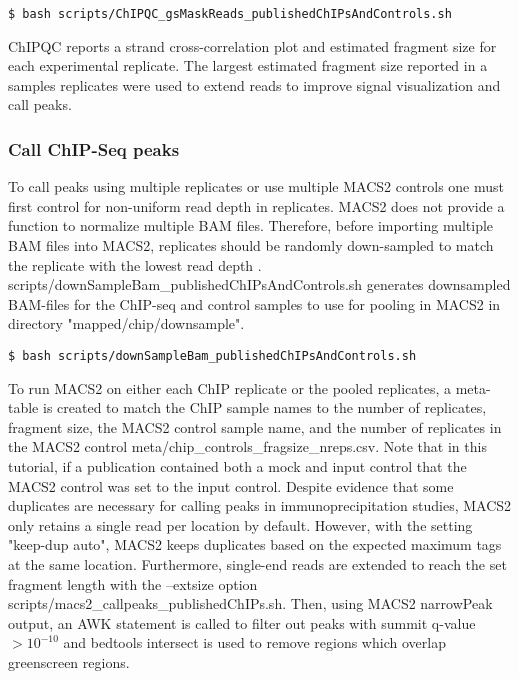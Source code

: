 \documentclass{article}
\begin{document}
\begin{sloppypar}
\begin{verbatim}
$ bash scripts/ChIPQC_gsMaskReads_publishedChIPsAndControls.sh
\end{verbatim}

ChIPQC reports a strand cross-correlation plot and estimated fragment size for each experimental replicate. The largest estimated fragment size reported in a samples replicates were used to extend reads to improve signal visualization and call peaks.

\subsubsection{Call ChIP-Seq peaks}

To call peaks using multiple replicates or use multiple MACS2 controls one must first control for non-uniform read depth in replicates. MACS2 does not provide a function to normalize multiple BAM files. Therefore, before importing multiple BAM files into MACS2, replicates should be randomly down-sampled to match the replicate with the lowest read depth \cite{downsamp}. {\selectfont scripts/downSampleBam\_publishedChIPsAndControls.sh} generates downsampled BAM-files for the ChIP-seq and control samples to use for pooling in MACS2  in directory "mapped/chip/downsample".

\begin{verbatim}
$ bash scripts/downSampleBam_publishedChIPsAndControls.sh
\end{verbatim}

To run MACS2 on either each ChIP replicate or the pooled replicates, a meta-table is created to match the ChIP sample names to the number of replicates, fragment size, the MACS2 control sample name, and the number of replicates in the MACS2 control {\selectfont meta/chip\_controls\_fragsize\_nreps.csv}. Note that in this tutorial, if a publication contained both a mock and input control that the MACS2 control was set to the input control. Despite evidence that some duplicates are necessary for calling peaks in immunoprecipitation studies, MACS2 only retains a single read per location by default. However, with the setting "keep-dup auto", MACS2 keeps duplicates based on the expected maximum tags at the same location. Furthermore, single-end reads are extended to reach the set fragment length with the --extsize option {\selectfont scripts/macs2\_callpeaks\_publishedChIPs.sh}. Then, using MACS2 narrowPeak output, an AWK statement is called to filter out peaks with summit q-value $>10^{-10}$ and bedtools intersect is used to remove regions which overlap greenscreen regions.


\end{sloppypar}
\end{document}
